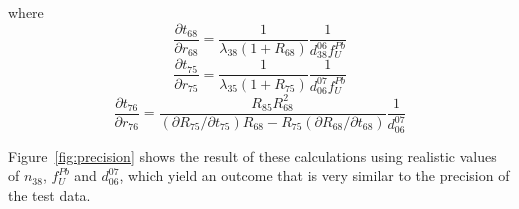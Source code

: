 \documentclass[gchron, manuscript]{copernicus}
\begin{document}
where
\begin{equation}
    \frac{\partial{t_{68}}}{\partial{r_{68}}} = 
    \frac{1}{\lambda_{38}(1+R_{68})} \frac{1}{d^{06}_{38}f^{Pb}_{U}}
\end{equation}
\begin{equation}  
    \frac{\partial{t_{75}}}{\partial{r_{75}}} = 
    \frac{1}{\lambda_{35}(1+R_{75})} \frac{1}{d^{07}_{06}f^{Pb}_{U}}
\end{equation}
\begin{equation}  
  \frac{\partial{t_{76}}}{\partial{r_{76}}} =
  \frac{R_{85}R_{68}^2}
       {(\partial{R_{75}}/\partial{t_{75}})R_{68} -
         R_{75}(\partial{R_{68}}/\partial{t_{68}})}
       \frac{1}{d^{07}_{06}}
\end{equation}

Figure~\ref{fig:precision} shows the result of these calculations
using realistic values of $n_{38}$, $f^{Pb}_{U}$ and $d^{07}_{06}$,
which yield an outcome that is very similar to the precision of the
test data.

\noappendix       %







\authorcontribution{} %

\end{document}
